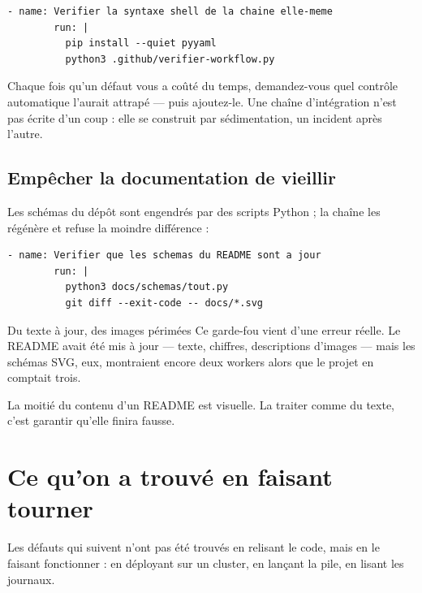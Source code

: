 \begin{lstlisting}[language=yamlplus,caption={\fichier{.github/workflows/ci.yml} --- la chaîne vérifie sa propre syntaxe}]
      - name: Verifier la syntaxe shell de la chaine elle-meme
        run: |
          pip install --quiet pyyaml
          python3 .github/verifier-workflow.py
\end{lstlisting}

\begin{retenir}
Chaque fois qu'un défaut vous a coûté du temps, demandez-vous quel contrôle
automatique l'aurait attrapé --- puis ajoutez-le. Une chaîne d'intégration
n'est pas écrite d'un coup : elle se construit par sédimentation, un incident
après l'autre.
\end{retenir}

\section{Empêcher la documentation de vieillir}

Les schémas du dépôt sont engendrés par des scripts Python ; la chaîne les
régénère et refuse la moindre différence :

\begin{lstlisting}[language=yamlplus]
      - name: Verifier que les schemas du README sont a jour
        run: |
          python3 docs/schemas/tout.py
          git diff --exit-code -- docs/*.svg
\end{lstlisting}

\begin{piege}{Du texte à jour, des images périmées}
Ce garde-fou vient d'une erreur réelle. Le README avait été mis à jour ---
texte, chiffres, descriptions d'images --- mais les schémas SVG, eux,
montraient encore deux workers alors que le projet en comptait trois.

La moitié du contenu d'un README est visuelle. La traiter comme du texte, c'est
garantir qu'elle finira fausse.
\end{piege}

\chapter{Ce qu'on a trouvé en faisant tourner}

Les défauts qui suivent n'ont pas été trouvés en relisant le code, mais en le
faisant fonctionner : en déployant sur un cluster, en lançant la pile, en
lisant les journaux.

